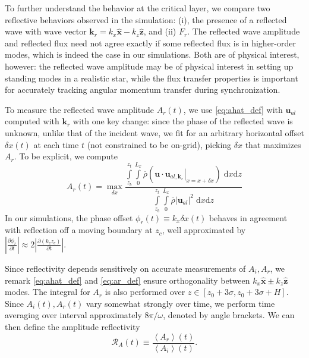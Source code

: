\documentclass[
        fleqn,
        usenatbib,
        referee,
    ]{mnras}
\newcommand*{\pd}[2]{\frac{\partial#1}{\partial#2}}
\newcommand*{\at}[1]{\left.#1\right|}
\newcommand*{\abs}[1]{\left|#1\right|}
\newcommand*{\ev}[1]{\left\langle#1\right\rangle}
\newcommand*{\p}[1]{\left(#1\right)}
\newcommand*{\bm}[1]{\mathbf{#1}}
\newcommand*{\uv}[1]{\hat{\mathbf{#1}}}
\begin{document}
To further understand the behavior at the critical layer, we compare two
reflective behaviors observed in the simulation: (i), the presence of a
reflected wave with wave vector $\bm{k}_r = k_{x}\uv{x} - k_{z}\uv{z}$, and (ii)
$F_r$. The reflected wave amplitude and reflected flux need not agree exactly if
some reflected flux is in higher-order modes, which is indeed the case in our
simulations. Both are of physical interest, however: the reflected wave
amplitude may be of physical interest in setting up standing modes in a
realistic star, while the flux transfer properties is important for accurately
tracking angular momentum transfer during synchronization.

To measure the reflected wave amplitude $A_r(t)$, we use \autoref{eq:ahat_def}
with $\bm{u}_{al}$ computed with $\bm{k}_r$ with one key change: since the phase
of the reflected wave is unknown, unlike that of the incident wave, we fit for
an arbitrary horizontal offset $\delta x(t)$ at each time $t$ (not constrained
to be on-grid), picking $\delta x$ that maximizes $A_r$. To be explicit, we
compute
\begin{equation}
    A_r(t) = \max_{\delta x}\frac{\int\limits_{z_b}^{z_t}\int\limits_0^{L_x}
        \overline{\rho}\p{\bm{u} \cdot \at{\bm{u}_{al,
        \bm{k}_r}}_{x = x + \delta x}}\;\mathrm{d}x\mathrm{d}z}
        {\int\limits_{z_b}^{z_t}\int\limits_0^{L_x}
        \overline{\rho}\abs{\bm{u}_{al}}^2\;\mathrm{d}x\mathrm{d}z}
        \label{eq:ar_def}
\end{equation}
In our simulations, the phase offset $\phi_r(t) \equiv k_x \delta x(t) $ behaves
in agreement with reflection off a moving boundary at $z_c$, well approximated
by $\abs{\pd{\phi_r}{t}} \approx 2\abs{\pd{(k_{z}z_c)}{t}}$.

Since reflectivity depends sensitively on accurate measurements of $A_i,
A_r$, we remark \autoref{eq:ahat_def} and \autoref{eq:ar_def} ensure
orthogonality between $k_{x}\uv{x} \pm k_{z}\uv{z}$ modes. The integral for
$A_r$ is also performed over $z \in [z_0 + 3\sigma, z_0 + 3\sigma + H]$. Since
$A_i(t), A_r(t)$ vary somewhat strongly over time, we perform time averaging
over interval approximately $8\pi/\omega$, denoted by angle brackets. We can
then define the amplitude reflectivity
\begin{equation}
    \mathcal{R}_A(t) \equiv \frac{\ev{A_r}(t)}{\ev{A_i}(t)}
        .\label{eq:Ra_def}
\end{equation}
\end{document}
